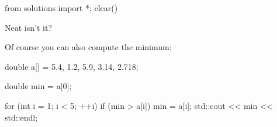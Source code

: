 \begin{python0}
from solutions import *; clear()
\end{python0}

Neat isn't it?

Of course you can also compute the minimum:

\begin{consolethree}[escapeinside=||]
double a[] = {5.4, 1.2, 5.9, 3.14, 2.718};

double min = a[0];

for (int i = 1; i < 5; ++i)
{
    if (min > a[i]) min = a[i];
    {
        std::cout << min << std::endl;
    }
} 
\end{consolethree}

